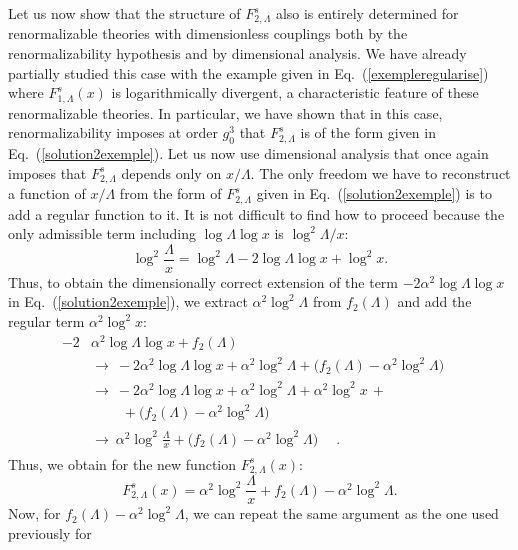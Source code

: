 \documentclass[floatfix,preprintnumbers,amsmath,amssymb,prb,12pt]{revtex4-1}
\newcommand{\be}{\begin{equation}}
\newcommand{\ee}{\end{equation}}
\begin{document}
Let us now show that the structure of $F_{2,\Lambda}^s$ also is 
entirely determined for renormalizable theories with
dimensionless couplings both by the renormalizability hypothesis
and by dimensional analysis. We have already partially studied
this case with the example given in Eq.~(\ref{exempleregularise})
where $F_{1,\Lambda}^s(x)$ is logarithmically divergent, a
characteristic feature of these renormalizable theories. In
particular, we have shown that in this case, renormalizability
imposes at order $g_0^3$ that $F_{2,\Lambda}^s$ is of the form
given in Eq.~(\ref{solution2exemple}). Let us now use dimensional
analysis that once again imposes that $F_{2,\Lambda}^s$ depends
only on $x/\Lambda$. The only freedom we have to reconstruct a
function of $x/\Lambda$ from the form of $F_{2,\Lambda}^s$ given
in Eq.~(\ref{solution2exemple}) is to add a regular function to
it. It is not difficult to find how to proceed because the only
admissible term including $\log\Lambda \log x$ is
$\log^2\Lambda/x$:
\begin{equation}
\log^2\frac{\Lambda}{x}= \log^2 \Lambda - 2 \log\Lambda \log x +
\log^2 x.
\end{equation}
Thus, to obtain the dimensionally correct extension of the term $-2
\alpha^2 \log\Lambda \log x$ in Eq.~(\ref{solution2exemple}), we 
extract $\alpha^2\log^2 \Lambda$ from $f_2(\Lambda)$ and add the
regular term $\alpha^2\log ^2x$:
\be
\begin{array}{ll}
-2& \alpha^2 \log\Lambda \log x + f_2(\Lambda)\\
&\displaystyle{\rightarrow\  -2 \alpha^2 \log\Lambda \log x + \alpha^2 \log^2\Lambda +\big(f_2(\Lambda)-\alpha^2 \log^2\Lambda \big)\phantom{\int}}\\
&\rightarrow\  -2 \alpha^2 \log\Lambda \log x + \alpha^2 \log^2\Lambda + \alpha^2 \log^2 x\, + \\
&\ \ \ \ \ \ \ \ \ \ +\big(f_2(\Lambda)-\alpha^2 \log^2\Lambda \big)\phantom{\int}\\
&\displaystyle{\rightarrow\  \alpha^2\log^2\frac{\Lambda}{x}+ \big(f_2(\Lambda)-\alpha^2 \log^2\Lambda \big)\phantom{\frac{\int}{\int}}}\ \ .
\end{array}
\ee
Thus, we obtain for the new function $F_{2,\Lambda}^s(x)$:
\begin{equation}
F_{2,\Lambda}^s(x)= \alpha^2 \log^2\frac{\Lambda}{x} +
f_2(\Lambda)-\alpha^2
\log^2\Lambda.
\end{equation}
Now, for $f_2(\Lambda)-\alpha^2 \log^2\Lambda$, we can repeat the
same argument as the one used previously for 
\end{document}
